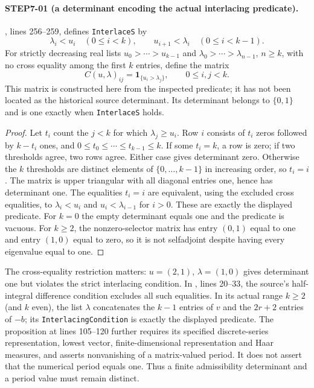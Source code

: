 \documentclass[11pt,a4paper]{article}
\begin{document}
\paragraph{STEP7-01 (a determinant encoding the actual interlacing predicate).}
, lines 256--259, defines \texttt{InterlaceS} by
\[
 \lambda_i<u_i\quad(0\le i<k),\qquad
 u_{i+1}<\lambda_i\quad(0\le i<k-1).
\]
For strictly decreasing real lists $u_0>\cdots>u_{k-1}$ and $\lambda_0>\cdots>\lambda_{n-1}$, $n\ge k$, with no cross equality among the first $k$ entries, define the matrix
\[
 C(u,\lambda)_{ij}=\mathbf1_{\{u_i>\lambda_j\}},\qquad 0\le i,j<k.
\]
This matrix is constructed here from the inspected predicate; it has not been located as the historical source determinant. Its determinant belongs to $\{0,1\}$ and is one exactly when \texttt{InterlaceS} holds.
\begin{proof}
Let $t_i$ count the $j<k$ for which $\lambda_j\ge u_i$. Row $i$ consists of $t_i$ zeros followed by $k-t_i$ ones, and $0\le t_0\le\cdots\le t_{k-1}\le k$. If some $t_i=k$, a row is zero; if two thresholds agree, two rows agree. Either case gives determinant zero. Otherwise the $k$ thresholds are distinct elements of $\{0,\ldots,k-1\}$ in increasing order, so $t_i=i$. The matrix is upper triangular with all diagonal entries one, hence has determinant one. The equalities $t_i=i$ are equivalent, using the excluded cross equalities, to $\lambda_i<u_i$ and $u_i<\lambda_{i-1}$ for $i>0$. These are exactly the displayed predicate. For $k=0$ the empty determinant equals one and the predicate is vacuous. For $k\ge2$, the nonzero-selector matrix has entry $(0,1)$ equal to one and entry $(1,0)$ equal to zero, so it is not selfadjoint despite having every eigenvalue equal to one.
\end{proof}
The cross-equality restriction matters: $u=(2,1)$, $\lambda=(1,0)$ gives determinant one but violates the strict interlacing condition. In , lines 20--33, the source's half-integral difference condition excludes all such equalities. In its actual range $k\ge2$ (and $k$ even), the list $\lambda$ concatenates the $k-1$ entries of $v$ and the $2r+2$ entries of $-b$; its \texttt{InterlacingCondition} is exactly the displayed predicate. The proposition at lines 105--120 further requires its specified discrete-series representation, lowest vector, finite-dimensional representation and Haar measures, and asserts nonvanishing of a matrix-valued period. It does not assert that the numerical period equals one. Thus a finite admissibility determinant and a period value must remain distinct.
\end{document}
